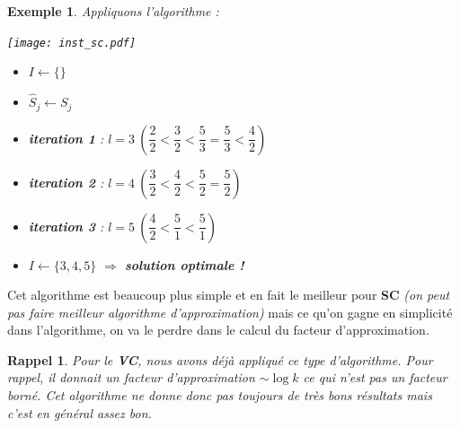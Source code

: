 \documentclass[12pt]{article}
\newcommand{\titre}[1]{\textcolor{title}{#1}}
\newtheorem{exemple}{Exemple}[section]
\newtheorem{rappel}{Rappel}[section]
\begin{document}
\begin{exemple} Appliquons l'algorithme :\\
\begin{multicols}{2}
\texttt{[image: inst\_sc.pdf]}
\begin{itemize}
\item[] $I \leftarrow \{\}$
\item[] $\hat{S}_j \leftarrow S_j$
\item[] \textbf{iteration 1} : $l = 3\ \left(\dfrac{2}{2} < \dfrac{3}{2} <
\dfrac{5}{3} = \dfrac{5}{3} < \dfrac{4}{2}\right)$
\item[] \textbf{iteration 2} : $l = 4\ \left(\dfrac{3}{2} < \dfrac{4}{2} <
\dfrac{5}{2} = \dfrac{5}{2}\right)$
\item[] \textbf{iteration 3} : $l = 5\ \left(\dfrac{4}{2} < \dfrac{5}{1} <
\dfrac{5}{1}\right)$
\item[] $I \leftarrow \{3,4,5\}$ $\Longrightarrow$ \textbf{solution optimale !}
\end{itemize}
\end{multicols}
\end{exemple}

Cet algorithme est beaucoup plus simple et en fait le meilleur pour
\textbf{\titre{SC}} \textit{(on peut pas faire meilleur algorithme
d'approximation)} mais ce qu'on gagne en simplicité dans l'algorithme, on va le
perdre dans le calcul du facteur d'approximation.

\begin{rappel}
Pour le \textbf{\titre{VC}}, nous avons déjà appliqué ce type d'algorithme.
Pour rappel, il donnait un facteur d'approximation $\sim\log{k}$ ce qui n'est
pas un facteur borné. Cet algorithme ne donne donc pas toujours de très bons
résultats mais c'est en général assez bon.
\end{rappel}
\end{document}

